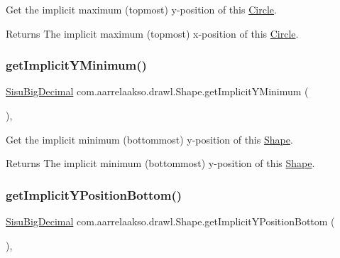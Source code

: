 Get the implicit maximum (topmost) y-\/position of this \hyperlink{classcom_1_1aarrelaakso_1_1drawl_1_1_circle}{Circle}.

\begin{DoxyReturn}{Returns}
The implicit maximum (topmost) x-\/position of this \hyperlink{classcom_1_1aarrelaakso_1_1drawl_1_1_circle}{Circle}. 
\end{DoxyReturn}
\mbox{\label{classcom_1_1aarrelaakso_1_1drawl_1_1_shape_aa0877965f7f172378e87ba69f27c7ad6}} 
\subsubsection{\texorpdfstring{get\+Implicit\+Y\+Minimum()}{getImplicitYMinimum()}}
{\footnotesize\ttfamily \hyperlink{classcom_1_1aarrelaakso_1_1drawl_1_1_sisu_big_decimal}{Sisu\+Big\+Decimal} com.\+aarrelaakso.\+drawl.\+Shape.\+get\+Implicit\+Y\+Minimum (\begin{DoxyParamCaption}{ }\end{DoxyParamCaption})\hspace{0.3cm}{\ttfamily [protected]}, {\ttfamily [inherited]}}

Get the implicit minimum (bottommost) y-\/position of this \hyperlink{classcom_1_1aarrelaakso_1_1drawl_1_1_shape}{Shape}.

\begin{DoxyReturn}{Returns}
The implicit minimum (bottommost) y-\/position of this \hyperlink{classcom_1_1aarrelaakso_1_1drawl_1_1_shape}{Shape}. 
\end{DoxyReturn}
\mbox{\label{classcom_1_1aarrelaakso_1_1drawl_1_1_shape_a5116673c093c60f66bba9fddf9533db6}} 
\subsubsection{\texorpdfstring{get\+Implicit\+Y\+Position\+Bottom()}{getImplicitYPositionBottom()}}
{\footnotesize\ttfamily \hyperlink{classcom_1_1aarrelaakso_1_1drawl_1_1_sisu_big_decimal}{Sisu\+Big\+Decimal} com.\+aarrelaakso.\+drawl.\+Shape.\+get\+Implicit\+Y\+Position\+Bottom (\begin{DoxyParamCaption}{ }\end{DoxyParamCaption})\hspace{0.3cm}{\ttfamily [protected]}, {\ttfamily [inherited]}}

